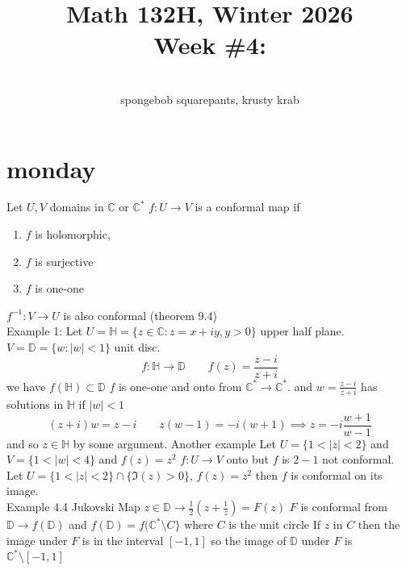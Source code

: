 \documentclass[11pt]{article}
\newcommand{\cnum}{Math 132H}
\newcommand{\ced}{Winter 2026}
\newcommand{\ctitle}[4]{\title{\vspace{-0.5in}\cnum, \ced\\Week #1: #2}\author{\vspace{-0.35in}\\#3, #4}}
\begin{document}
\ctitle{\#4}{}{spongebob squarepants}{krusty krab}
\date{}
\maketitle
\section{monday}
Let $U, V$ domains in  $ \mathbb{C}$ or $ \mathbb{C}^{*}$ 
$f : U \rightarrow V$ is a conformal map
if 
\begin{enumerate}
    \item $f$ is holomorphic,
    \item $f$ is surjective
    \item $f$ is one-one
\end{enumerate}
$f^{-1} : V \rightarrow U$ is also conformal (theorem 9.4)\\
Example 1:
Let $U = \mathbb{H} = \{z \in \mathbb{C} : z = x +iy, y > 0\}$ upper half plane.
$V = \mathbb{D} = \{w : |w| < 1\}$ unit disc.
\[
    f: \mathbb{H} \to \mathbb{D} \qquad f(z) = \frac{z-i}{z+i}
\] 
we have $f( \mathbb{H}) \subset \mathbb{D}$ $f$ is one-one and onto from $ \mathbb{C}^{*} \rightarrow \mathbb{C}^{*}$.
and $w = \frac{z-i}{z+i}$ has solutions in $ \mathbb{H}$ if  $|w| < 1$
 \[
     (z+i)w = z-i \qquad z(w-1) = -i(w+1) \implies z = -i \frac{w+1}{w-1}
\] 
and so $z \in \mathbb{H}$ by some argument.
Another example Let
$U = \{1 < |z| < 2\}$ and  $V = \{1 < |w| < 4\}$ and  $f(z) = z^{2}$ $f : U \rightarrow V$ onto but $f$ is  $2-1$ not conformal.
\\Let
$U  = \{1 < |z| < 2\} \cap \{\Im(z) > 0\}$, $f(z) = z^2$ then $f$ is conformal on its image.\\
Example 4.4 Jukovski Map
$z \in \mathbb{D} \rightarrow \frac{1}{2}(z + \frac{1}{z}) = F(z)$ 
$F$ is conformal from $\mathbb{D} \rightarrow f(\mathbb{D})$ and $f(\mathbb{D}) = f( \mathbb{C}^{*} \setminus C\}$ where $C$ is the unit circle
If  $z $ in  $C$ then the image under  $F$ is in the interval $[-1,1]$ so the image of  $ \mathbb{D}$ under $F$ is  $ \mathbb{C}^{*} \setminus [-1,1]$
\end{document}
